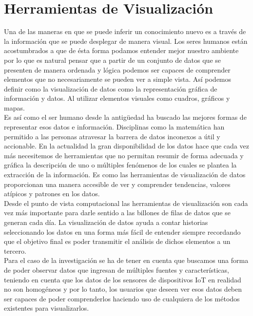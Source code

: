 \section{Herramientas de Visualización}
Una de las maneras en que se puede inferir un conocimiento nuevo es a través de la información que se puede desplegar de manera visual. Los seres humanos están acostumbrados a que de ésta forma podamos entender mejor nuestro ambiente por lo que es natural pensar que a partir de un conjunto de datos que se presenten de manera ordenada y lógica podemos ser capaces de comprender elementos que no necesariamente se pueden ver a simple vista. Así podemos definir como la visualización de datos como la  representación gráfica de información y datos. Al utilizar elementos visuales como cuadros, gráficos y mapas\cite{visualizaciondef}.\\

Es así como el ser humano desde la antigüedad ha buscado las mejores formas de representar esos datos e información. Disciplinas como la matemática han permitido a las personas atravesar la barrera de datos inconexos a  útil y accionable. En la actualidad la gran disponibilidad de los datos hace que cada vez más necesitemos de herramientas que no permitan resumir de forma adecuada y gráfica la descripción de uno o múltiples fenómenos de los cuales se plantea la extracción de la información. Es como las herramientas de visualización de datos proporcionan una manera accesible de ver y comprender tendencias, valores atípicos y patrones en los datos.\\

Desde el punto de vista computacional las herramientas de visualización son cada vez más importante para darle sentido a las billones de filas de datos que se generan cada día. La visualización de datos ayuda a contar historias seleccionando los datos en una forma más fácil de entender\cite{visualizaciondef} siempre recordando que el objetivo final es poder transmitir el análisis de dichos elementos a un tercero.\\

Para el caso de la investigación se ha de tener en cuenta que buscamos una forma de poder observar datos que ingresan de múltiples fuentes y características, teniendo en cuenta que los datos de los sensores de dispositivos IoT en realidad no son homogéneos y por lo tanto, los usuarios que deseen ver esos datos deben ser capaces de poder comprenderlos haciendo uso de cualquiera de los métodos existentes para visualizarlos. 

